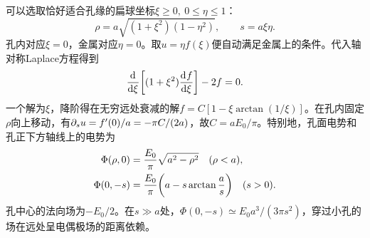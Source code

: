 可以选取恰好适合孔缘的扁球坐标$\xi \ge 0,\ 0 \le \eta \le 1$：
\[
    \rho = a\sqrt{(1 + \xi^2)(1 - \eta^2)},\qquad s = a\xi\eta.
\]
孔内对应$\xi = 0$，金属对应$\eta = 0$。取$u = \eta f(\xi)$便自动满足金属上的条件。代入轴对称Laplace方程得到
\[
    \frac{\mathop{}\!\mathrm{d}^{}}{\mathrm{d}{\xi}^{}}\biggl[(1 + \xi^2)\frac{\mathop{}\!\mathrm{d}^{}f}{\mathrm{d}{\xi}^{}}\biggr] - 2f = 0.
\]
一个解为$\xi$，降阶得在无穷远处衰减的解$f = C[1 - \xi\arctan(1/\xi)]$。在孔内固定$\rho$向上移动，有$\partial_s u = f'(0)/a = -\pi C/(2a)$，故$C = aE_0/\pi$。特别地，孔面电势和孔正下方轴线上的电势为
\begin{align}
    \Phi(\rho,0) &= \frac{E_0}{\pi}\sqrt{a^2 - \rho^2}\quad(\rho < a),\\
    \Phi(0,-s) &= \frac{E_0}{\pi}\biggl(a - s\arctan\frac{a}{s}\biggr)\quad(s > 0).
\end{align}
孔中心的法向场为$-E_0/2$。在$s \gg a$处，$\Phi(0,-s) \simeq E_0a^3/(3\pi s^2)$，穿过小孔的场在远处呈电偶极场的距离依赖。

